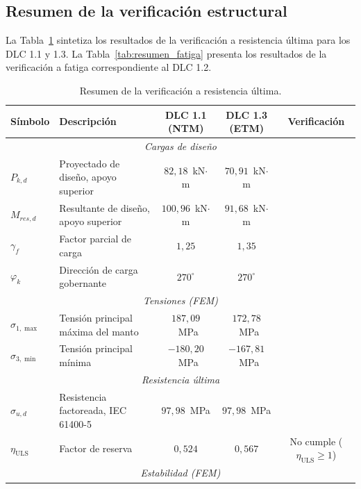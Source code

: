 \subsection{Resumen de la verificación estructural}
\label{sec:resumen_verificacion}

La Tabla~\ref{tab:resumen_uls} sintetiza los resultados de la verificación a resistencia última para los DLC 1.1 y 1.3. La Tabla~\ref{tab:resumen_fatiga} presenta los resultados de la verificación a fatiga correspondiente al DLC 1.2.

\begin{table}[H]
    \centering
    \caption{Resumen de la verificación a resistencia última.}
    \label{tab:resumen_uls}
    \begin{tabular}{l>{\raggedright\arraybackslash}p{5.0cm}ccc}
        \hline
        \textbf{Símbolo} & \textbf{Descripción} & \textbf{DLC 1.1 (NTM)} & \textbf{DLC 1.3 (ETM)} & \textbf{Verificación} \\
        \hline
        \multicolumn{5}{c}{\textit{Cargas de diseño}} \\
        \hline
        $P_{k,d}$ & Proyectado de diseño, apoyo superior & $82{,}18$~kN$\cdot$m & $70{,}91$~kN$\cdot$m &  \\
        $M_{res,d}$ & Resultante de diseño, apoyo superior & $100{,}96$~kN$\cdot$m & $91{,}68$~kN$\cdot$m &  \\
        $\gamma_f$ & Factor parcial de carga & $1{,}25$ & $1{,}35$ &  \\
        $\varphi_k$ & Dirección de carga gobernante & $270^\circ$ & $270^\circ$ &  \\
        \hline
        \multicolumn{5}{c}{\textit{Tensiones (FEM)}} \\
        \hline
        $\sigma_{1,\max}$ & Tensión principal máxima del manto & $187{,}09$~MPa & $172{,}78$~MPa &  \\
        $\sigma_{3,\min}$ & Tensión principal mínima & $-180{,}20$~MPa & $-167{,}81$~MPa &  \\
        \hline
        \multicolumn{5}{c}{\textit{Resistencia última}} \\
        \hline
        $\sigma_{u,d}$ & Resistencia factoreada, IEC 61400-5 & $97{,}98$~MPa & $97{,}98$~MPa &  \\
        $\eta_{\text{ULS}}$ & Factor de reserva & $0{,}524$ & $0{,}567$ & No cumple ($\eta_{\text{ULS}} \geq 1$) \\
        \hline
        \multicolumn{5}{c}{\textit{Estabilidad (FEM)}} \\

\end{tabular}
\end{table}
